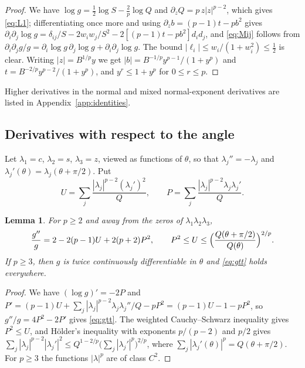 \documentclass[11pt]{amsart}
\newtheorem{lemma}[theorem]{Lemma}
\theoremstyle{definition}
\theoremstyle{remark}
\numberwithin{equation}{section}
\begin{document}
\begin{proof}
We have $\log g=\frac12\log S-\frac2p\log Q$ and $\partial_zQ=p\,z|z|^{p-2}$, which gives \eqref{eq:L1}; differentiating once more and using $\partial_zb=(p-1)t-pb^2$ gives $\partial_i\partial_j\log g=\delta_{ij}/S-2w_iw_j/S^2-2[(p-1)t-pb^2]d_id_j$, and \eqref{eq:Mij} follows from $\partial_i\partial_jg/g=\partial_i\log g\,\partial_j\log g+\partial_i\partial_j\log g$. The bound $|\ell_i|\le w_i/(1+w_i^2)\le\frac12$ is clear. Writing $|z|=B^{1/p}y$ we get $|b|=B^{-1/p}y^{p-1}/(1+y^p)$ and $t=B^{-2/p}y^{p-2}/(1+y^p)$, and $y^r\le1+y^p$ for $0\le r\le p$.
\end{proof}

Higher derivatives in the normal and mixed normal-exponent derivatives are listed in Appendix~\ref{app:identities}.

\subsection{Derivatives with respect to the angle}

Let $\lambda_1=c$, $\lambda_2=s$, $\lambda_3=z$, viewed as functions of $\theta$, so that $\lambda_j''=-\lambda_j$ and $\lambda_j'(\theta)=\lambda_j(\theta+\pi/2)$. Put
\[
U=\sum_j\frac{|\lambda_j|^{p-2}(\lambda_j')^2}{Q},\qquad P=\sum_j\frac{|\lambda_j|^{p-2}\lambda_j\lambda_j'}{Q}.
\]

\begin{lemma}\label{lem:angle}
For $p\ge2$ and away from the zeros of $\lambda_1\lambda_2\lambda_3$,
\begin{equation}\label{eq:gtt}
\frac{g''}{g}=2-2(p-1)U+2(p+2)P^2,\qquad P^2\le U\le\Bigl(\frac{Q(\theta+\pi/2)}{Q(\theta)}\Bigr)^{2/p}.
\end{equation}
If $p\ge3$, then $g$ is twice continuously differentiable in $\theta$ and \eqref{eq:gtt} holds everywhere.
\end{lemma}

\begin{proof}
We have $(\log g)'=-2P$ and $P'=(p-1)U+\sum_j|\lambda_j|^{p-2}\lambda_j\lambda_j''/Q-pP^2=(p-1)U-1-pP^2$, so $g''/g=4P^2-2P'$ gives \eqref{eq:gtt}. The weighted Cauchy--Schwarz inequality gives $P^2\le U$, and Hölder's inequality with exponents $p/(p-2)$ and $p/2$ gives $\sum_j|\lambda_j|^{p-2}|\lambda_j'|^2\le Q^{1-2/p}\bigl(\sum_j|\lambda_j'|^p\bigr)^{2/p}$, where $\sum_j|\lambda_j'(\theta)|^p=Q(\theta+\pi/2)$. For $p\ge3$ the functions $|\lambda|^p$ are of class $C^2$.
\end{proof}
\end{document}
